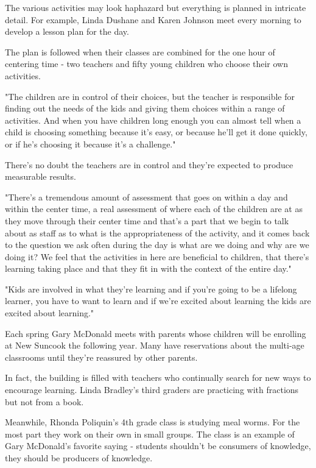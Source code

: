 The various activities may look haphazard but everything is planned in intricate detail. For example, Linda Dushane and Karen Johnson meet every morning to develop a lesson plan for the day.

The plan is followed when their classes are combined for the one hour of centering time - two teachers and fifty young children who choose their own activities.

"The children are in control of their choices, but the teacher is responsible for finding out the needs of the kids and giving them choices within a range of activities. And when you have children long enough you can almost tell when a child is choosing something because it's easy, or because he'll get it done quickly, or if he's choosing it because it's a challenge."

There's no doubt the teachers are in control and they're expected to produce measurable results.

"There's a tremendous amount of assessment that goes on within a day and within the center time, a real assessment of where each of the children are at as they move through their center time and that's a part that we begin to talk about as staff as to what is the appropriateness of the activity, and it comes back to the question we ask often during the day is what are we doing and why are we doing it? We feel that the activities in here are beneficial to children, that there's learning taking place and that they fit in with the context of the entire day."

"Kids are involved in what they're learning and if you're going to be a lifelong learner, you have to want to learn and if we're excited about learning the kids are excited about learning."

Each spring Gary McDonald meets with parents whose children will be enrolling at New Suncook the following year. Many have reservations about the multi-age classrooms until they're reassured by other parents.

In fact, the building is filled with teachers who continually search for new ways to encourage learning. Linda Bradley's third graders are practicing with fractions but not from a book.

Meanwhile, Rhonda Poliquin's 4th grade class is studying meal worms. For the most part they work on their own in small groups. The class is an example of Gary McDonald's favorite saying - students shouldn't be consumers of knowledge, they should be producers of knowledge.

